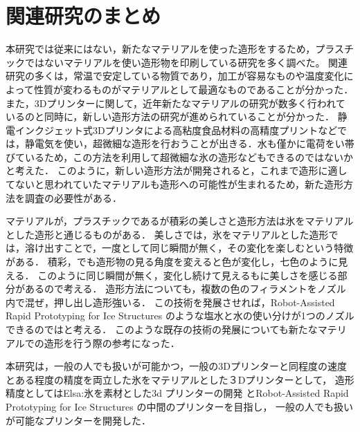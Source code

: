\section{関連研究のまとめ}
\label{sec:enum}

本研究では従来にはない，新たなマテリアルを使った造形をするため，プラスチックではないマテリアルを使い造形物を印刷している研究を多く調べた。
関連研究の多くは，常温で安定している物質であり，加工が容易なものや温度変化によって性質が変わるものがマテリアルとして最適なものであることが分かった．
また，3Dプリンターに関して，近年新たなマテリアルの研究が数多く行われているのと同時に，新しい造形方法の研究が進められていることが分かった．
静電インクジェット式3Dプリンタによる高粘度食品材料の高精度プリント\cite{e}などでは，静電気を使い，超微細な造形を行おうことが出きる．水も僅かに電荷をい帯びているため，この方法を利用して超微細な氷の造形などもできるのではないかと考えた．
このように，新しい造形方法が開発されると，これまで造形に適してないと思われていたマテリアルも造形への可能性が生まれるため，新た造形方法を調査の必要性がある．

マテリアルが，プラスチックであるが積彩\cite{h}の美しさと造形方法は氷をマテリアルとした造形と通じるものがある．
美しさでは，氷をマテリアルとした造形では，溶け出すことで，一度として同じ瞬間が無く，その変化を楽しむという特徴がある．
積彩，でも造形物の見る角度を変えると色が変化し，七色のように見える．
このように同じ瞬間が無く，変化し続けて見えるもに美しさを感じる部分があるので考える．
造形方法についても，複数の色のフィラメントをノズル内で混ぜ，押し出し造形強いる．
この技術を発展させれば，Robot-Assisted Rapid Prototyping for Ice Structures \cite{ss}のような塩水と水の使い分けが1つのノズルできるのではと考える．
このような既存の技術の発展についても新たなマテリアルでの造形を行う際の参考になった．

本研究は，一般の人でも扱いが可能かつ，一般の3Dプリンターと同程度の速度とある程度の精度を両立した氷をマテリアルとした３Dプリンターとして，
造形精度としてはElsa:氷を素材とした3d プリンターの開発 \cite{h} とRobot-Assisted Rapid Prototyping for Ice Structures \cite{ss} の中間のプリンターを目指し，
一般の人でも扱いが可能なプリンターを開発した．

